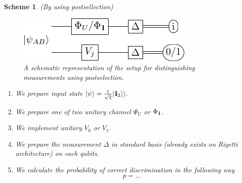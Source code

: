 \documentclass[preprint,12pt, a4paper]{elsarticle}
\newcommand{\ket}[1]{\ensuremath{|#1\rangle}}
\newcommand{\1}{{\rm 1\hspace{-0.9mm}l}}
\newcommand{\Id}{{\rm 1\hspace{-0.9mm}l}}
\newtheorem{scheme}{Scheme}
\begin{document}
\begin{scheme}(By using postsellection)

\begin{figure}[h!]
\centering 
\includegraphics[scale=1.2]{pics/postselection} 

\caption{ A schematic representation of the setup for distinguishing
	measurements using postselection. 
}\label{fig:postsellection}
\end{figure}
\begin{enumerate}
\item We prepare input state $\ket{\psi} = \frac{1}{\sqrt{2} } | \Id_2 \rangle 
\rangle. $
\item We prepare one of two unitary channel $\Phi_{U} $ or $\Phi_{\1}$. 
\item We implement unitary $V_0 $ or $ V_1$.
\item We prepare the measurement $\Delta$ in standard basis (already exists on 
Rigetti architecture) on each qubits.
\item We calculate the probability of correct discrimination in the following 
way
\begin{equation}
p = ...
\end{equation}
\end{enumerate}
\end{scheme}
\end{document}
